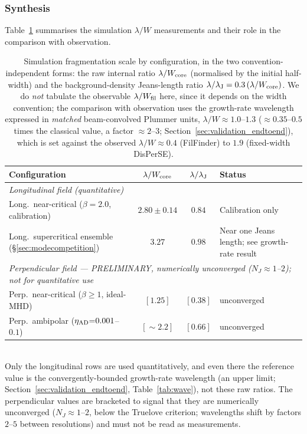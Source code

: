 \documentclass[usenatbib,twoside,twocolumn]{mnras}
\begin{document}
\subsubsection{Synthesis}

Table~\ref{tab:cross_campaign} summarises the simulation $\lambda/W$ measurements and their role in the comparison with observation.

\begin{table}
\caption{Simulation fragmentation scale by configuration, in the two convention-independent forms: the raw internal ratio $\lambda/W_{\rm core}$ (normalised by the initial half-width) and the background-density Jeans-length ratio $\lambda/\lambda_{\rm J}=0.3\,(\lambda/W_{\rm core})$. We do \emph{not} tabulate the observable $\lambda/W_{\rm fil}$ here, since it depends on the width convention; the comparison with observation uses the growth-rate wavelength expressed in \emph{matched} beam-convolved Plummer units, $\lambda/W\approx1.0$--$1.3$ ($\approx0.35$--$0.5$ times the classical value, a factor $\approx2$--$3$; Section~\ref{sec:validation_endtoend}), which is set against the observed $\lambda/W\approx0.4$ (FilFinder) to $1.9$ (fixed-width DisPerSE).}
\label{tab:cross_campaign}
\footnotesize
\setlength{\tabcolsep}{4pt}
\begin{tabular}{lccl}
\toprule
Configuration & $\lambda/W_{\rm core}$ & $\lambda/\lambda_{\rm J}$ & Status \\
\midrule
\multicolumn{4}{l}{\emph{Longitudinal field (quantitative)}} \\
Long.\ near-critical ($\beta{=}2.0$, calibration) & $2.80{\pm}0.14$ & $0.84$ & Calibration only \\
Long.\ supercritical ensemble (\S\ref{sec:modecompetition}) & $3.27$ & $0.98$ & Near one Jeans length; see growth-rate result \\
\midrule
\multicolumn{4}{l}{\emph{Perpendicular field --- PRELIMINARY, numerically unconverged ($N_J{\approx}1$--$2$); not for quantitative use}} \\
Perp.\ near-critical ($\beta{\geq}1$, ideal-MHD) & $[1.25]$ & $[0.38]$ & unconverged \\
Perp.\ ambipolar ($\eta_{\rm AD}{=}0.001$--$0.1$) & $[{\sim}2.2]$ & $[0.66]$ & unconverged \\
\bottomrule
\end{tabular}
\\[2pt]
Only the longitudinal rows are used quantitatively, and even there the reference value is the convergently-bounded growth-rate wavelength (an upper limit; Section~\ref{sec:validation_endtoend}, Table~\ref{tab:wave}), not these raw ratios. The perpendicular values are bracketed to signal that they are numerically unconverged ($N_J\approx1$--$2$, below the Truelove criterion; wavelengths shift by factors $2$--$5$ between resolutions) and must not be read as measurements.
\end{table}
\end{document}
